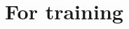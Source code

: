 \documentclass[main.tex]{article}
\begin{document}
\newpage
\appendix \label{appendix}

\section{For training}

\end{document}
